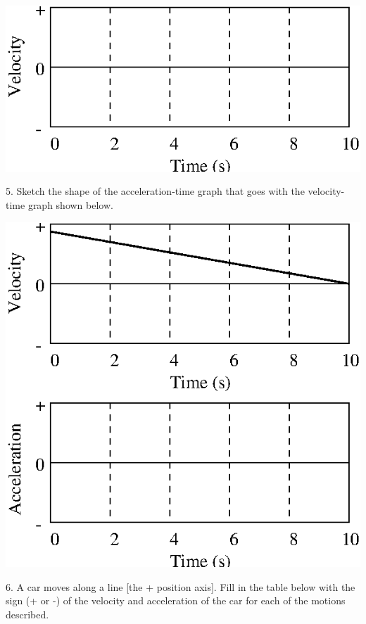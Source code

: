 \vspace{0.3cm}
{\par\centering \includegraphics{slowing/slowing_fig9.eps} \par}
\vspace{0.3cm}

5. Sketch the shape of the acceleration-time graph that goes with the velocity-time
graph shown below.

\vspace{0.3cm}
{\par\centering \includegraphics{slowing/slowing_fig10.eps} \par}
\vspace{0.3cm}

\newpage 

6. A car moves along a line {[}the + position axis{]}. Fill in the table below
with the sign (+ or -) of the velocity and acceleration of the car for each
of the motions described.

